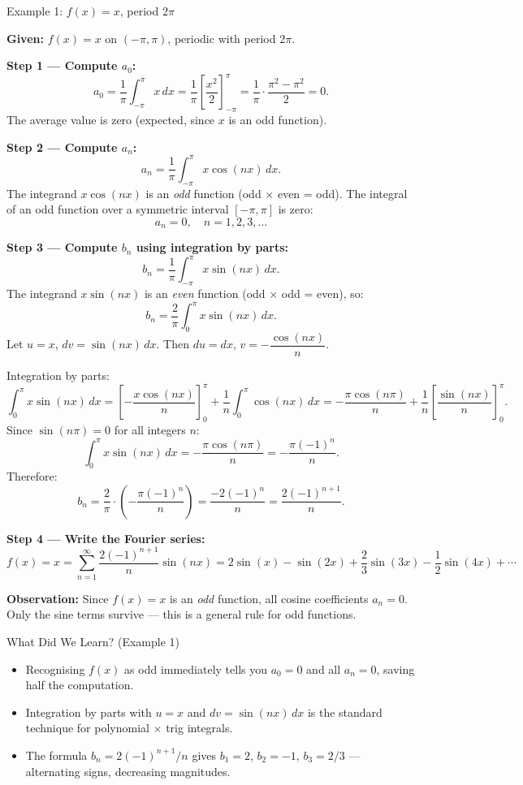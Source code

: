 \documentclass[12pt,a4paper]{article}
\begin{document}
\begin{infobox}{Example 1: $f(x) = x$, period $2\pi$}

\textbf{Given:} $f(x) = x$ on $(-\pi, \pi)$, periodic with period $2\pi$.

\medskip
\textbf{Step 1 --- Compute $a_0$:}
\[
a_0 = \frac{1}{\pi}\int_{-\pi}^{\pi} x\,dx = \frac{1}{\pi}\left[\frac{x^2}{2}\right]_{-\pi}^{\pi} = \frac{1}{\pi}\cdot\frac{\pi^2 - \pi^2}{2} = 0.
\]
The average value is zero (expected, since $x$ is an odd function).

\medskip
\textbf{Step 2 --- Compute $a_n$:}
\[
a_n = \frac{1}{\pi}\int_{-\pi}^{\pi} x\cos(nx)\,dx.
\]
The integrand $x\cos(nx)$ is an \emph{odd} function (odd $\times$ even = odd).
The integral of an odd function over a symmetric interval $[-\pi, \pi]$ is zero:
\[
a_n = 0, \quad n = 1, 2, 3, \ldots
\]

\medskip
\textbf{Step 3 --- Compute $b_n$ using integration by parts:}
\[
b_n = \frac{1}{\pi}\int_{-\pi}^{\pi} x\sin(nx)\,dx.
\]
The integrand $x\sin(nx)$ is an \emph{even} function (odd $\times$ odd = even), so:
\[
b_n = \frac{2}{\pi}\int_{0}^{\pi} x\sin(nx)\,dx.
\]
Let $u = x$, $dv = \sin(nx)\,dx$. Then $du = dx$, $v = -\dfrac{\cos(nx)}{n}$.

Integration by parts:
\[
\int_0^{\pi} x\sin(nx)\,dx = \left[-\frac{x\cos(nx)}{n}\right]_0^{\pi} + \frac{1}{n}\int_0^{\pi}\cos(nx)\,dx
= -\frac{\pi\cos(n\pi)}{n} + \frac{1}{n}\left[\frac{\sin(nx)}{n}\right]_0^{\pi}.
\]
Since $\sin(n\pi) = 0$ for all integers $n$:
\[
\int_0^{\pi} x\sin(nx)\,dx = -\frac{\pi\cos(n\pi)}{n} = -\frac{\pi(-1)^n}{n}.
\]
Therefore:
\[
b_n = \frac{2}{\pi}\cdot\left(-\frac{\pi(-1)^n}{n}\right) = \frac{-2(-1)^n}{n} = \frac{2(-1)^{n+1}}{n}.
\]

\textbf{Step 4 --- Write the Fourier series:}
\[
f(x) = x = \sum_{n=1}^{\infty}\frac{2(-1)^{n+1}}{n}\sin(nx)
= 2\sin(x) - \sin(2x) + \frac{2}{3}\sin(3x) - \frac{1}{2}\sin(4x) + \cdots
\]

\textbf{Observation:} Since $f(x) = x$ is an \emph{odd} function, all cosine coefficients $a_n = 0$.
Only the sine terms survive --- this is a general rule for odd functions.
\end{infobox}

\begin{learnbox}{What Did We Learn? (Example 1)}
\begin{itemize}
  \item Recognising $f(x)$ as odd immediately tells you $a_0 = 0$ and all $a_n = 0$, saving half the computation.
  \item Integration by parts with $u = x$ and $dv = \sin(nx)\,dx$ is the standard technique for polynomial $\times$ trig integrals.
  \item The formula $b_n = 2(-1)^{n+1}/n$ gives $b_1 = 2$, $b_2 = -1$, $b_3 = 2/3$ --- alternating signs, decreasing magnitudes.
\end{itemize}
\end{learnbox}
\end{document}
